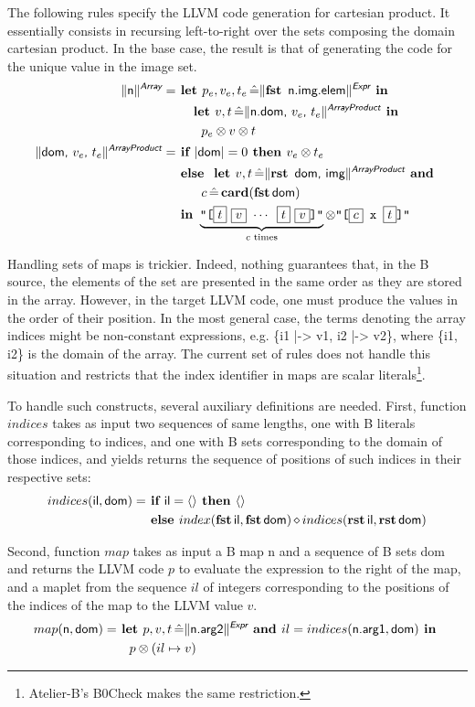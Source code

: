 \documentclass{llncs}
\newcommand{\trad}[2]{\ensuremath{\lVert \textsf{#1} \rVert^{\textit{#2}}}}
\DeclareMathOperator{\conc}{\diamond}
\newcommand{\llvm}[1]{\texttt{#1}}
\newcommand{\B}[1]{\textsf{#1}}
\newcommand{\IF}[0]{\textbf{ if }}
\newcommand{\ELSE}[0]{\textbf{ else }}
\newcommand{\THEN}[0]{\textbf{ then }}
\newcommand{\LET}[0]{\textbf{ let }}
\DeclareMathOperator{\BE}{\hat{=}}
\newcommand{\IN}[0]{\textbf{ in }}
\newcommand{\AND}[0]{\textbf{ and }}
\newcommand{\PH}[1]{\framebox{$#1$}}
\newcommand{\sep}[0]{\otimes}
\begin{document}
The following rules specify the LLVM code generation for cartesian
product. It essentially consists in recursing left-to-right over the
sets composing the domain cartesian product. In the base case, the
result is that of generating the code for the unique value in the
image set.
\begin{align*}
\trad{n}{\B{Array}} =
& \LET p_e, v_e, t_e \BE \trad{\fst\, n.img.elem}{\B{Expr}} \IN \\ 
& \quad \LET v, t \BE \trad{n.dom, $v_e$, $t_e$}{\B{ArrayProduct}} \IN \\
& \quad \quad p_e \sep v \sep t \\
\trad{dom, $v_e$, $t_e$}{\B{ArrayProduct}} = 
& \IF |\B{dom}| = 0 \THEN v_e \sep t_e \\
& \ELSE \LET v, t \BE \trad{\rst\, dom, img}{\B{ArrayProduct}} \AND \\
& \quad \quad c \BE \card(\fst\, \B{dom}) \\
& \IN \underbrace{\llvm{"[\PH{t}\,\,\PH{v} $\cdots$ \PH{t}\,\,\PH{v}]"}}_{c \text{ times}}
\sep \llvm{"[\PH{c} x \PH{t}]"}
\end{align*}

Handling sets of maps is trickier. Indeed, nothing guarantees that, in
the B source, the elements of the set are presented in the same order
as they are stored in the array. However, in the target LLVM code, one
must produce the values in the order of their position. In the most
general case, the terms denoting the array indices might be
non-constant expressions, e.g. \B{\{i1 |-> v1, i2 |-> v2\}}, where
\B{\{i1, i2\}} is the domain of the array. The current set of rules
does not handle this situation and restricts that the index identifier
in maps are scalar literals\footnote{Atelier-B's B0Check makes the same
  restriction.}. 

To handle such constructs, several auxiliary definitions are needed.
First, function $indices$ takes as input two sequences of same
lengths, one with B literals corresponding to indices, and one with B
sets corresponding to the domain of those indices, and yields returns
the sequence of positions of such indices in their respective sets:
\begin{align*}
indices(\B{il}, \B{dom}) =& \IF \B{il} = \langle \rangle \THEN \langle \rangle \\
& \ELSE index(\fst\, \B{il}, \fst\,\B{dom}) \conc indices(\rst\, \B{il}, \rst\, \B{dom})
\end{align*}

Second, function $map$ takes as input a B map \B{n} and a sequence of
B sets \B{dom} and returns the LLVM code $p$ to evaluate the
expression to the right of the map, and a maplet from the sequence
$il$ of integers corresponding to the positions of the indices of the
map to the LLVM value $v$.
\begin{align*}
map(\B{n}, \B{dom}) =& 
\LET p, v, t \BE \trad{n.arg2}{\B{Expr}} \AND il = indices(\B{n.arg1}, \B{dom}) \IN \\
& \quad p \sep (il \mapsto v)
\end{align*}
\end{document}
